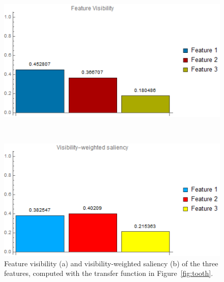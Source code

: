 \begin{figure}
	\centering
	\begin{minipage}{.45\textwidth}
		\includegraphics[width=1\linewidth]{images/tooth_naive_visibility_chart}
		\subcaption{}
	\end{minipage}~
	\begin{minipage}{.45\textwidth}
		\includegraphics[width=1\linewidth]{images/tooth_naive_visibility_saliency_weighted_chart}
		\subcaption{}
	\end{minipage}
	\caption{Feature visibility \cite{wang_efficient_2011} (a) and visibility-weighted saliency (b) of the three features, computed with the transfer function in Figure~\ref{fig:tooth}.}
	\label{fig:tooth_saliency_chart}
\end{figure}

